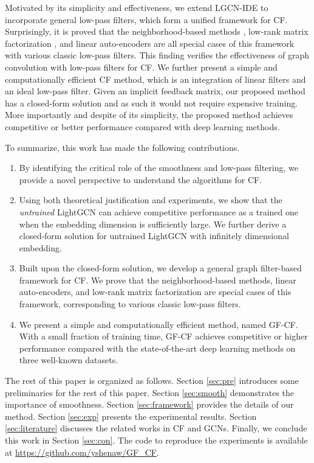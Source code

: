 \documentclass[sigconf]{acmart}
\begin{document}
Motivated by its simplicity and effectiveness, we extend LGCN-IDE to incorporate general low-pass filters, which form a unified framework for CF. Surprisingly, it is proved that the neighborhood-based methods \cite{aiolli2013efficient}, low-rank matrix factorization \cite{chen2021scalable}, and linear auto-encoders \cite{steck2020autoencoders} are all special cases of this framework with various classic low-pass filters. This finding verifies the effectiveness of graph convolution with low-pass filters for CF. We further present a simple and computationally efficient CF method, which is an integration of linear filters and an ideal low-pass filter. Given an implicit feedback matrix, our proposed method has a closed-form solution and as such it would not require expensive training. More importantly and despite of its simplicity, the proposed method achieves competitive or better performance compared with deep learning methods.

To summarize, this work has made the following contributions.
\begin{enumerate}
    \item By identifying the critical role of the smoothness and low-pass filtering, we provide a novel perspective to understand the algorithms for CF.
    \item Using both theoretical justification and experiments, we show that the \emph{untrained} LightGCN can achieve competitive performance as a trained one when the embedding dimension is sufficiently large. We further derive a closed-form solution for untrained LightGCN with infinitely dimensional embedding.
    \item Built upon the closed-form solution, we develop a general graph filter-based framework for CF. We prove that the neighborhood-based methods, linear auto-encoders, and low-rank matrix factorization are special cases of this framework, corresponding to various classic low-pass filters.
    \item We present a simple and computationally efficient method, named GF-CF. With a small fraction of training time, GF-CF achieves competitive or higher performance compared with the state-of-the-art deep learning methods on three well-known datasets.
\end{enumerate}
The rest of this paper is organized as follows. Section \ref{sec:pre} introduces some preliminaries for the rest of this paper. Section \ref{sec:smooth} demonstrates the importance of smoothness. Section \ref{sec:framework} provides the details of our method. Section \ref{sec:exp} presents the experimental results. Section \ref{sec:literature} discusses the related works in CF and GCNs. Finally, we conclude this work in Section \ref{sec:con}. The code to reproduce the experiments is available at \url{https://github.com/yshenaw/GF_CF}.
\end{document}
